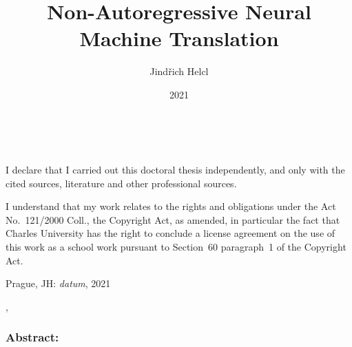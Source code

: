 \documentclass[12pt,notitlepage,a4paper,openright]{report}
\title{Non-Autoregressive Neural Machine Translation}
\author{Jindřich Helcl}
\date{2021}
\def\JH#1{{\color{blue}JH: \it #1}}
\begin{document}
%
%
%
\renewcommand{\thepage}{\roman{page}}
\maketitle

\pagestyle{plain}
\normalsize %
\setcounter{page}{2} %

\cleardoublepage{}
\ \vspace{10mm}

\noindent \it

\vspace{\fill}
\noindent \rm
I declare that I carried out this doctoral thesis independently,
  and only with the cited sources, literature and other professional sources.

I understand that my work relates to the rights and obligations
  under the Act No.~121/2000 Coll., the Copyright Act, as amended,
  in particular the fact that Charles University has the right
  to conclude a license agreement on the use of this work as a school work
  pursuant to Section~60 paragraph~1 of the Copyright Act.

\vspace{2cm}
\noindent Prague, \JH{datum}, 2021 \hspace{\fill}\theauthor\\ %


\cleardoublepage{} %
\pagestyle{plain}
{}
\begin{description}[leftmargin=7.5em,labelwidth=7em,labelindent=0em,labelsep=0.5em]
\item[Title:] \thetitle{}
\item[Author:] \theauthor{}
\item[Department:] \thedept{}
\item[Supervisor:] \thesupervisor{},\\ \thedept{}
\end{description}
\subsubsection{Abstract:}
\end{document}
